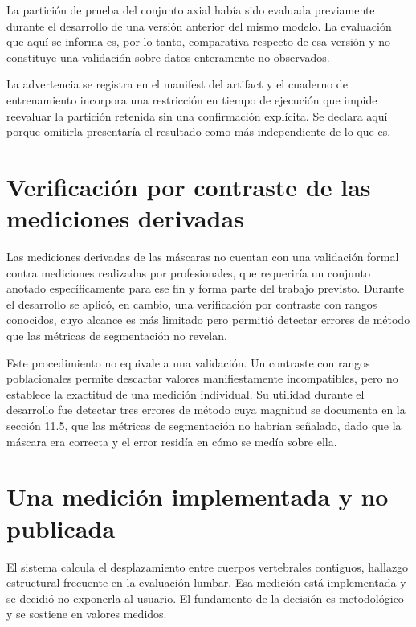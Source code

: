 La partición de prueba del conjunto axial había sido evaluada previamente durante el desarrollo de una versión anterior del mismo modelo. La evaluación que aquí se informa es, por lo tanto, comparativa respecto de esa versión y no constituye una validación sobre datos enteramente no observados.

La advertencia se registra en el manifest del artifact y el cuaderno de entrenamiento incorpora una restricción en tiempo de ejecución que impide reevaluar la partición retenida sin una confirmación explícita. Se declara aquí porque omitirla presentaría el resultado como más independiente de lo que es.

\section{Verificación por contraste de las mediciones derivadas}

Las mediciones derivadas de las máscaras no cuentan con una validación formal contra mediciones realizadas por profesionales, que requeriría un conjunto anotado específicamente para ese fin y forma parte del trabajo previsto. Durante el desarrollo se aplicó, en cambio, una verificación por contraste con rangos conocidos, cuyo alcance es más limitado pero permitió detectar errores de método que las métricas de segmentación no revelan.


Este procedimiento no equivale a una validación. Un contraste con rangos poblacionales permite descartar valores manifiestamente incompatibles, pero no establece la exactitud de una medición individual. Su utilidad durante el desarrollo fue detectar tres errores de método cuya magnitud se documenta en la sección 11.5, que las métricas de segmentación no habrían señalado, dado que la máscara era correcta y el error residía en cómo se medía sobre ella.

\section{Una medición implementada y no publicada}

El sistema calcula el desplazamiento entre cuerpos vertebrales contiguos, hallazgo estructural frecuente en la evaluación lumbar. Esa medición está implementada y se decidió no exponerla al usuario. El fundamento de la decisión es metodológico y se sostiene en valores medidos.

